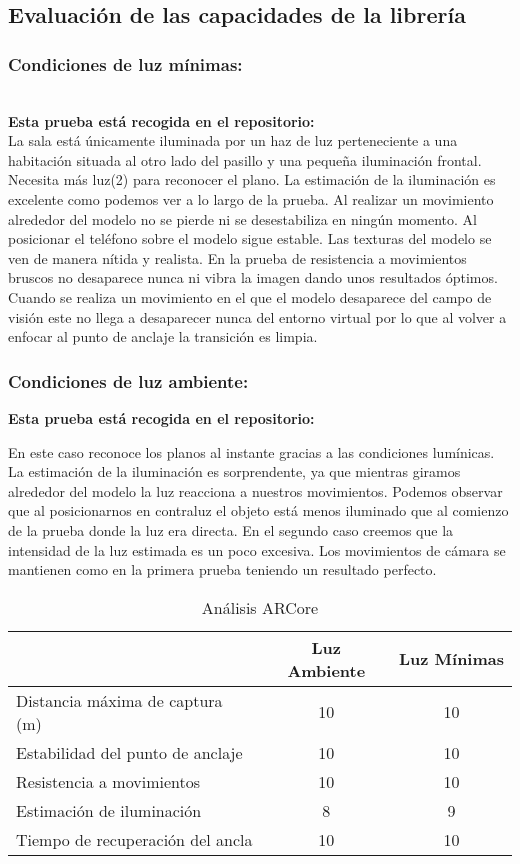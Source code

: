 \subsection{Evaluación de las capacidades de la librería}
\subsubsection{Condiciones de luz mínimas:}\\
\textbf{Esta prueba está recogida en el repositorio:}\\
La sala está únicamente iluminada por un haz de luz perteneciente a una habitación situada al otro lado del pasillo y una pequeña iluminación frontal.\\

Necesita más luz(2) para reconocer el plano. La estimación de la iluminación es excelente como podemos ver a lo largo de la prueba. Al realizar un movimiento alrededor del modelo no se pierde ni se desestabiliza en ningún momento. Al posicionar el teléfono sobre el modelo sigue estable. Las texturas del modelo se ven de manera nítida y realista. En la prueba de resistencia a movimientos bruscos no desaparece nunca ni vibra la imagen dando unos resultados óptimos. Cuando se realiza un movimiento en el que el modelo desaparece del campo de visión este no llega a desaparecer nunca del entorno virtual por lo que al volver a enfocar al punto de anclaje la transición es limpia.

\subsubsection{Condiciones de luz ambiente:}

\textbf{Esta prueba está recogida en el repositorio:}

En este caso reconoce los planos al instante gracias a las condiciones lumínicas. La estimación de la iluminación es sorprendente, ya que mientras giramos alrededor del modelo la luz reacciona a nuestros movimientos. Podemos observar que al posicionarnos en contraluz el objeto está menos iluminado que al comienzo de la prueba donde la luz era directa. En el segundo caso creemos que la intensidad de la luz estimada es un poco excesiva. Los movimientos de cámara se mantienen como en la primera prueba teniendo un resultado perfecto.

\begin{table}[H]
    \centering
    \begin{tabular}{|l|c|c|}
    \hline
          & Luz Ambiente & Luz Mínimas \\
         \hline
        Distancia máxima de captura (m)  &10 &10\\
        \hline
        Estabilidad del punto de anclaje  &10 &10\\
        \hline
        Resistencia a movimientos  &10 &10 \\
        \hline
        Estimación de iluminación  &8 &9 \\
        \hline
        Tiempo de recuperación del ancla  &10 &10 \\
      \hline
    \end{tabular}
    \caption{Análisis ARCore}
    \label{tab:TARCore}
\end{table}
